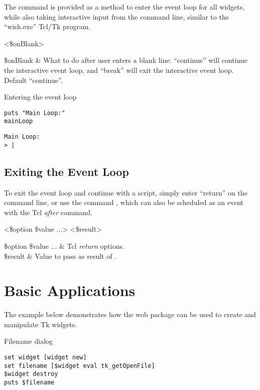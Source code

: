 \documentclass{article}
\renewcommand{\^}[1]{\textsuperscript{#1}}
\renewcommand{\_}[1]{\textsubscript{#1}}
\begin{document}
The command  is provided as a method to enter the event loop for all widgets, while also taking interactive input from the command line, similar to the ``wish.exe'' Tcl/Tk program.
\begin{syntax}
   	 <\$onBlank>
\end{syntax}
\begin{args}
   	\$onBlank & What to do after user enters a blank line: ``continue'' will continue the interactive event loop, and ``break'' will exit the interactive event loop. Default ``continue''.
\end{args}

\begin{example}{Entering the event loop}
\begin{lstlisting}
puts "Main Loop:"
mainLoop
\end{lstlisting}
\tcblower
\begin{lstlisting}
Main Loop:
> |
\end{lstlisting}
\end{example}

\subsection{Exiting the Event Loop}
To exit the event loop and continue with a script, simply enter ``return'' on the command line, or use the command , which can also be scheduled as an event with the Tcl \textit{after} command.
\begin{syntax}
 <\$option \$value ...> <\$result>
\end{syntax}
\begin{args}
\$option \$value ... & Tcl \textit{return} options. \\
\$result & Value to pass as result of .
\end{args}

\clearpage
\section{Basic Applications}
The example below demonstrates how the wob package can be used to create and manipulate Tk widgets.
\begin{example}{Filename dialog}
\begin{lstlisting}
set widget [widget new]
set filename [$widget eval tk_getOpenFile]
$widget destroy
puts $filename
\end{lstlisting}
\end{example}
\end{document}
